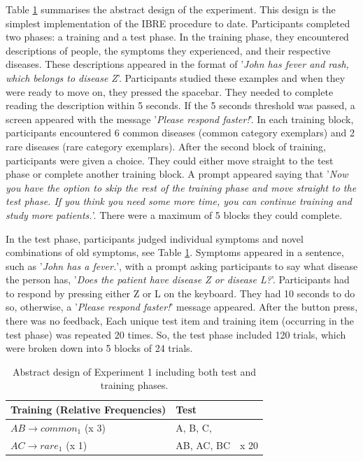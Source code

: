 \documentclass[10pt,letterpaper]{article}
\begin{document}
Table \ref{tab:abstract-exp1} summarises the abstract design of the experiment.
This design is the simplest implementation of the IBRE procedure to date.
Participants completed two phases: a training and a test phase.
In the training phase, they encountered descriptions of people, the symptoms they experienced, and their respective diseases.
These descriptions appeared in the format of '\textit{John has fever and rash, which belongs to disease Z}'.
Participants studied these examples and when they were ready to move on, they pressed the spacebar.
They needed to complete reading the description within 5 seconds.
If the 5 seconds threshold was passed, a screen appeared with the message '\textit{Please respond faster!}'.
In each training block, participants encountered 6 common diseases (common category exemplars) and 2 rare diseases (rare category exemplars).
After the second block of training, participants were given a choice.
They could either move straight to the test phase or complete another training block.
A prompt appeared saying that '\textit{Now you have the option to skip the rest of the training phase and move straight to the test phase. If you think you need some more time, you can continue training and study more patients.}'.
There were a maximum of 5 blocks they could complete.

In the test phase, participants judged individual symptoms and novel combinations of old symptoms, see Table \ref*{tab:abstract-exp1}.
Symptoms appeared in a sentence, such as '\textit{John has a fever.}', with a prompt asking participants to say what disease the person has, '\textit{Does the patient have disease Z or disease L?}'.
Participants had to respond by pressing either Z or L on the keyboard.
They had 10 seconds to do so, otherwise, a '\textit{Please respond faster!}' message appeared.
After the button press, there was no feedback,
Each unique test item and training item (occurring in the test phase) was repeated 20 times.
So, the test phase included 120 trials, which were broken down into 5 blocks of 24 trials.

\begin{table}[!ht]
  \begin{center}
    \caption{Abstract design of Experiment 1 including both test and training phases. \\}
    \label{tab:abstract-exp1}
    \begin{tabular}{llr} %
      \textbf{Training (Relative Frequencies)} & \textbf{Test}& \\
      \hline
      $AB \to common_{1}$ (x 3) &  A, B, C,         &  \\
      $AC \to rare_{1}$   (x 1) &  AB, AC, BC      & x 20 \\
      \hline
    \end{tabular}
  \end{center}
\end{table}
\end{document}
